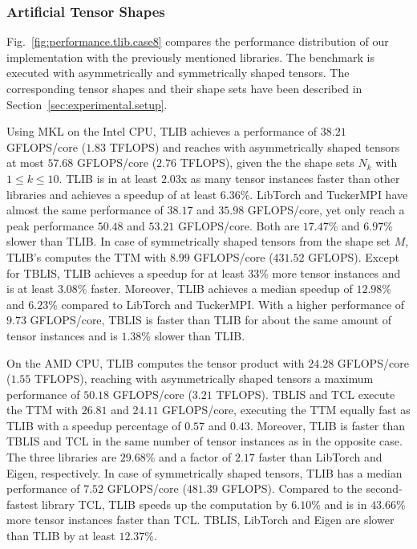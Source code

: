 \subsubsection{Artificial Tensor Shapes}
Fig.~\ref{fig:performance.tlib.case8} compares the performance distribution of our implementation with the previously mentioned libraries.
The benchmark is executed with asymmetrically and symmetrically shaped tensors.
The corresponding tensor shapes and their shape sets have been described in Section~\ref{sec:experimental.setup}.

Using MKL on the Intel CPU, TLIB achieves a performance of $38.21$ GFLOPS/core ($1.83$ TFLOPS) and reaches with asymmetrically shaped tensors at most $57.68$ GFLOPS/core ($2.76$ TFLOPS), given the the shape sets $N_k$ with $1 \leq k \leq 10$.
TLIB is in at least $2.03$x as many tensor instances faster than other libraries and achieves a speedup of at least $6.36$\%.
LibTorch and TuckerMPI have almost the same performance of $38.17$ and $35.98$ GFLOPS/core, yet only reach a peak performance $50.48$ and $53.21$ GFLOPS/core.
Both are $17.47$\% and $6.97$\% slower than TLIB.
In case of symmetrically shaped tensors from the shape set $M$, TLIB's computes the TTM with $8.99$ GFLOPS/core ($431.52$ GFLOPS).
Except for TBLIS, TLIB achieves a speedup for at least $33$\% more tensor instances and is at least $3.08$\% faster.
Moreover, TLIB achieves a median speedup of $12.98$\% and $6.23$\% compared to LibTorch and TuckerMPI.
With a higher performance of $9.73$ GFLOPS/core, TBLIS is faster than TLIB for about the same amount of tensor instances and is $1.38$\% slower than TLIB.

On the AMD CPU, TLIB computes the tensor product with $24.28$ GFLOPS/core ($1.55$ TFLOPS), reaching with asymmetrically shaped tensors a maximum performance of $50.18$ GFLOPS/core ($3.21$ TFLOPS).
TBLIS and TCL execute the TTM with $26.81$ and $24.11$ GFLOPS/core, executing the TTM equally fast as TLIB with a speedup percentage of $0.57$ and $0.43$.
Moreover, TLIB is faster than TBLIS and TCL in the same number of tensor instances as in the opposite case.
The three libraries are $29.68$\% and a factor of $2.17$ faster than LibTorch and Eigen, respectively.
In case of symmetrically shaped tensors, TLIB has a median performance of $7.52$ GFLOPS/core ($481.39$ GFLOPS).
Compared to the second-fastest library TCL, TLIB speeds up the computation by $6.10$\% and is in $43.66$\% more tensor instances faster than TCL.
TBLIS, LibTorch and Eigen are slower than TLIB by at least $12.37$\%.

